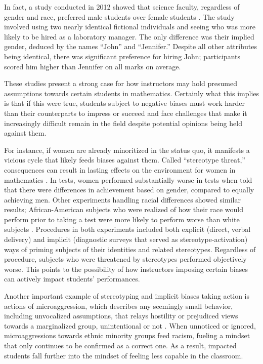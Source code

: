 In fact, a study conducted in 2012 showed that science faculty, regardless of gender and race, preferred male students over female students \citep{moss-racusin_science_2012}. The study involved using two nearly identical fictional individuals and seeing who was more likely to be hired as a laboratory manager. The only difference was their implied gender, deduced by the names ``John'' and ``Jennifer.'' Despite all other attributes being identical, there was significant preference for hiring John; participants scored him higher than Jennifer on all marks on average.

These studies present a strong case for how instructors may hold presumed assumptions towards certain students in mathematics. Certainly what this implies is that if this were true, students subject to negative biases must work harder than their counterparts to impress or succeed and face challenges that make it increasingly difficult remain in the field despite potential opinions being held against them.

For instance, if women are already minoritized in the status quo, it manifests a vicious cycle that likely feeds biases against them. Called ``stereotype threat,'' consequences can result in lasting effects on the environment for women in mathematics \citep{spencer_stereotype_1999}. In tests, women performed substantially worse in tests when told that there were differences in achievement based on gender, compared to equally achieving men. Other experiments handling racial differences showed similar results; African-American subjects who were realized of how their race would perform prior to taking a test were more likely to perform worse than white subjects \citep{steele_stereotype_1995}. Procedures in both experiments included both explicit (direct, verbal delivery) and implicit (diagnostic surveys that served as stereotype-activation) ways of priming subjects of their identities and related stereotypes. Regardless of procedure, subjects who were threatened by stereotypes performed objectively worse. This points to the possibility of how instructors imposing certain biases can actively impact students' performances.

Another important example of stereotyping and implicit biases taking action is actions of microaggression, which describes any seemingly small behavior, including unvocalized assumptions, that relays hostility or prejudiced views towards a marginalized group, unintentional or not \citep{sue_racial_2007}. When unnoticed or ignored, microaggressions towards ethnic minority groups feed racism, fueling a mindset that only continues to be confirmed as a correct one. As a result, impacted students fall further into the mindset of feeling less capable in the classroom.

